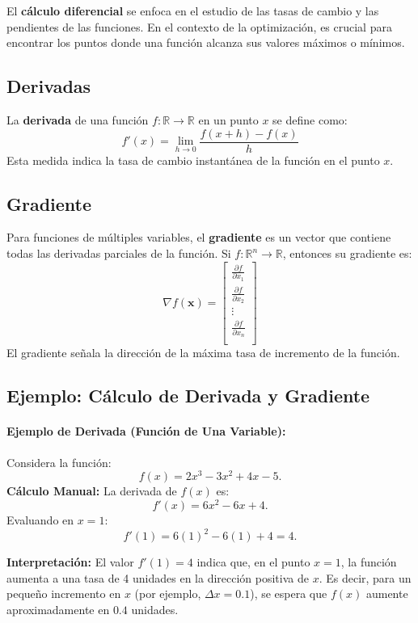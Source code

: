 \documentclass[12pt,a4,oneside]{book}
\begin{document}
	El \textbf{cálculo diferencial} se enfoca en el estudio de las tasas de cambio y las pendientes de las funciones. En el contexto de la optimización, es crucial para encontrar los puntos donde una función alcanza sus valores máximos o mínimos.
	
	\subsection{Derivadas}
	
	La \textbf{derivada} de una función \(f: \mathbb{R} \to \mathbb{R}\) en un punto \(x\) se define como:
	\[
	f'(x) = \lim_{h \to 0} \frac{f(x+h) - f(x)}{h}
	\]
	Esta medida indica la tasa de cambio instantánea de la función en el punto \(x\).
	
	\subsection{Gradiente}
	
	Para funciones de múltiples variables, el \textbf{gradiente} es un vector que contiene todas las derivadas parciales de la función. Si \(f: \mathbb{R}^n \to \mathbb{R}\), entonces su gradiente es:
	\[
	\nabla f(\mathbf{x}) = \begin{bmatrix}
		\frac{\partial f}{\partial x_1} \\
		\frac{\partial f}{\partial x_2} \\
		\vdots \\
		\frac{\partial f}{\partial x_n} \\
	\end{bmatrix}
	\]
	El gradiente señala la dirección de la máxima tasa de incremento de la función.
	
	\subsection{Ejemplo: Cálculo de Derivada y Gradiente}
	
	\paragraph{Ejemplo de Derivada (Función de Una Variable):}  
	Considera la función:
	\[
	f(x) = 2x^3 - 3x^2 + 4x - 5.
	\]
	\textbf{Cálculo Manual:}  
	La derivada de \( f(x) \) es:
	\[
	f'(x) = 6x^2 - 6x + 4.
	\]
	Evaluando en \( x = 1 \):
	\[
	f'(1) = 6(1)^2 - 6(1) + 4 = 4.
	\]
	
	\textbf{Interpretación:}  
	El valor \( f'(1) = 4 \) indica que, en el punto \( x = 1 \), la función aumenta a una tasa de 4 unidades en la dirección positiva de \( x \). Es decir, para un pequeño incremento en \( x \) (por ejemplo, \( \Delta x = 0.1 \)), se espera que \( f(x) \) aumente aproximadamente en \( 0.4 \) unidades.
	
\end{document}
